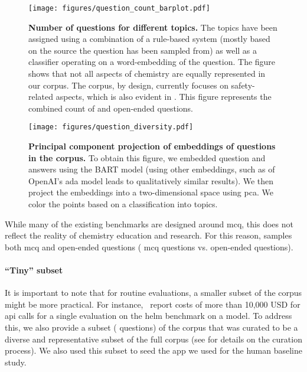 \documentclass[11pt, oneside]{article}
\begin{document}
\begin{refsection}
\begin{figure}
    \centering
    \texttt{[image: figures/question\_count\_barplot.pdf]}
    \caption{\textbf{Number of questions for different topics.} The topics have been assigned using a combination of a rule-based system (mostly based on the source the question has been sampled from) as well as a classifier operating on a word-embedding of the question. 
    The figure shows that not all aspects of chemistry are equally represented in our corpus. The \chembench corpus, by design, currently focuses on safety-related aspects, which is also evident in . This figure represents the combined count of  and open-ended questions.}
    \label{fig:topic_barplot}
\end{figure}

\begin{figure}
    \centering
    \texttt{[image: figures/question\_diversity.pdf]}
    \caption{\textbf{Principal component projection of embeddings of questions in the \chembench corpus.} To obtain this figure, we embedded question and answers using the BART model (using other embeddings, such as of OpenAI's ada model leads to qualitatively similar results). We then project the embeddings into a two-dimensional space using \gls{pca}. We color the points based on a classification into topics.}
    \label{fig:question_diversity}
\end{figure}

While many of the existing benchmarks are designed around \gls{mcq}, this does not reflect the reality of chemistry education and research.
For this reason, \chembench samples both \gls{mcq} and open-ended questions ( \gls{mcq} questions vs.  open-ended questions).


\paragraph{\enquote{Tiny} subset}
It is important to note that for routine evaluations, a smaller subset of the corpus might be more practical.\autocite{polo2024tinybenchmarks}
For instance,~\textcite{liang2023holistic} report costs of more than 10,000 USD for \gls{api} calls for a single evaluation on the \gls{helm} benchmark on a model. 
To address this, we also provide a subset ( questions) of the corpus that was curated to be a diverse and representative subset of the full corpus (see  for details on the curation process).
We also used this subset to seed the app we used for the human baseline study. 



\end{refsection}
\end{document}
